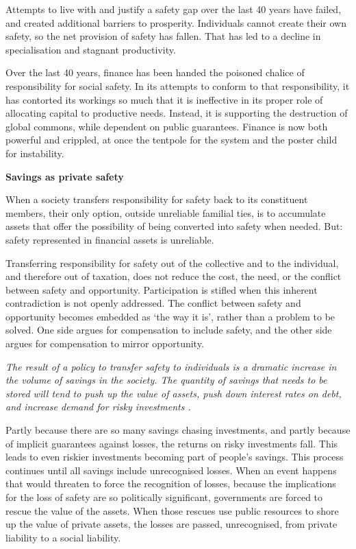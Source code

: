 \documentclass[
]{book}
\begin{document}
Attempts to live with and justify a safety gap over the last 40 years have failed, and created additional
barriers to prosperity. Individuals cannot create their own safety, so the net provision of safety has fallen.
That has led to a decline in specialisation and stagnant productivity.

Over the last 40 years, finance has been handed the poisoned chalice of responsibility for social
safety. In its attempts to conform to that responsibility, it has contorted its workings so much that it
is ineffective in its proper role of allocating capital to productive needs. Instead, it is supporting the
destruction of global commons, while dependent on public guarantees.
Finance is now
both powerful and crippled, at once the tentpole for the system and the poster child for instability.

\textbf{Savings as private safety}

When
a society transfers responsibility for safety back to its constituent members, their only option, outside
unreliable familial ties, is to accumulate assets that offer the possibility of being converted into safety
when needed.
But: safety represented in financial assets is unreliable.

Transferring responsibility for safety out of the collective and to the individual, and therefore out
of taxation, does not reduce the cost, the need, or the conflict between safety and opportunity.
Participation is stifled when this inherent contradiction is not openly addressed. The conflict between
safety and opportunity becomes embedded as `the way it is', rather than a problem to be solved.
One side argues for compensation to include safety, and the other side argues for compensation to
mirror opportunity.

\emph{The result of a policy to transfer safety to individuals is a dramatic increase in the volume of savings in the society.
The quantity of savings that needs to be stored will tend to push up the value of assets,
push down interest rates on debt, and increase demand for risky investments
.}

Partly because there are so many savings chasing investments, and partly because of implicit
guarantees against losses, the returns on risky investments fall. This leads to even riskier investments
becoming part of people's savings.
This process continues until all savings include unrecognised
losses. When an event happens that would threaten to force the recognition of losses, because the
implications for the loss of safety are so politically significant, governments are forced to rescue the
value of the assets. When those rescues use public resources to shore up the value of private assets,
the losses are passed, unrecognised, from private liability to a social liability.
\end{document}
